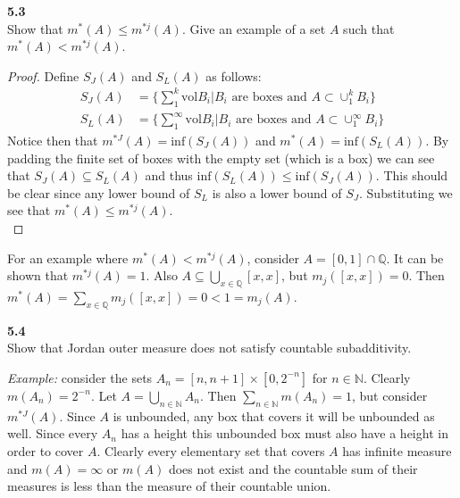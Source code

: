 \documentclass[12pt]{article}
\newcommand{\problem}[1]{\hspace{-4 ex} \large \textbf{#1}\\}
\begin{document}
\problem{5.3} Show that $m^*(A)\leq m^{*j}(A)$. Give an example of a set $A$ such that $m^*(A)<m^{*j}(A)$.
	
	\begin{proof}
		Define $S_J(A)$ and $S_L(A)$ as follows:
		\begin{align*}
			S_J(A) & = \Bigg\{\sum_1^k\text{vol}B_i \Bigg \vert B_i \text{ are boxes and } A \subset \cup_1^k B_i \Bigg\} \\
			S_L(A) & = \Bigg\{\sum_1^\infty\text{vol}B_i \Bigg \vert B_i \text{ are boxes and } A \subset \cup_1^\infty B_i \Bigg\}
		\end{align*}
	Notice then that $m^{*J}(A) = \text{inf}(S_J(A))$ and $m^{*}(A) = \text{inf}(S_L(A))$. By padding the finite set of boxes with the empty set (which is a box) we can see that $S_J(A) \subseteq S_L(A)$ and thus $\text{inf}(S_L(A)) \leq \text{inf}(S_J(A))$. This should be clear since any lower bound of $S_L$ is also a lower bound of $S_J$. Substituting we see that $m^*(A)\leq m^{*j}(A)$. \\
	\end{proof}
	
	For an example where $m^*(A)<m^{*j}(A)$, consider $A = [0,1] \cap \mathbb{Q}$. It can be shown that $m^{*j}(A)=1$. Also $A \subseteq \bigcup\limits_{x \in \mathbb{Q}}[x,x]$, but $m_j([x,x])=0$. Then $m^*(A) = \sum\limits_{x \in \mathbb{Q}}m_j([x,x]) = 0 < 1 = m_j(A)$. 


\problem{5.4} Show that Jordan outer measure does not satisfy countable subadditivity.

	\textit{Example:} consider the sets $A_n = [n,n+1] \times [0, 2^{-n}]$ for $n \in \mathbb{N}$. Clearly $m(A_n) = 2^{-n}$. Let $A = \bigcup\limits_{n \in \mathbb{N}}A_n$. Then $\sum\limits_{n \in \mathbb{N}}m(A_n) = 1$, but consider $m^{*J}(A)$. Since $A$ is unbounded, any box that covers it will be unbounded as well. Since every $A_n$ has a height this unbounded box must also have a height in order to cover $A$. Clearly every elementary set that covers $A$ has infinite measure and $m(A) = \infty$ or $m(A)$ does not exist and the countable sum of their measures is less than the measure of their countable union.
\end{document}

